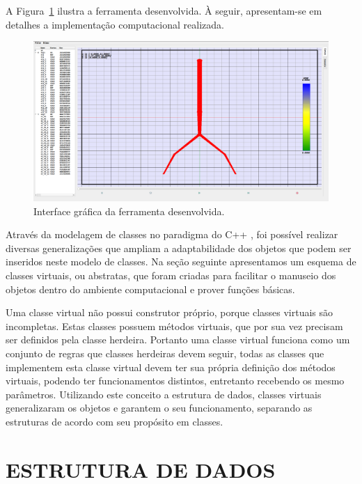 \documentclass[a4paper,12pt]{monografia}
\theoremstyle{plain}
\theoremstyle{definition}
\theoremstyle{remark}
\begin{document}
A Figura~\ref{fig1:gui} ilustra a ferramenta desenvolvida. À seguir, apresentam-se em detalhes a implementação computacional realizada.

\begin{figure}[!htbp]
	\centering
	\includegraphics[scale=0.25]{Figures/IGU_002.png}
	\caption{Interface gráfica da ferramenta desenvolvida.}
	\label{fig1:gui}
\end{figure}

Através da modelagem de classes no paradigma do C++ \cite{AlanParker}, foi possível realizar diversas generalizações que ampliam a adaptabilidade dos objetos que podem ser inseridos neste modelo de classes. Na seção seguinte apresentamos um esquema de classes virtuais, ou abstratas, que foram criadas para facilitar o manuseio dos objetos dentro do ambiente computacional e prover funções básicas. 

Uma classe virtual não possui construtor próprio, porque classes virtuais são incompletas. Estas classes possuem métodos virtuais, que por sua vez precisam ser definidos pela classe herdeira. Portanto uma classe virtual funciona como um conjunto de regras que classes herdeiras devem seguir, todas as classes que implementem esta classe virtual devem ter sua própria definição dos métodos virtuais, podendo ter funcionamentos distintos, entretanto recebendo os mesmo parâmetros.  Utilizando este conceito a estrutura de dados, classes virtuais generalizaram os objetos e garantem o seu funcionamento, separando as estruturas de acordo com seu propósito em classes.

\section{ESTRUTURA DE DADOS}\label{sec:estrutura}
\end{document}
